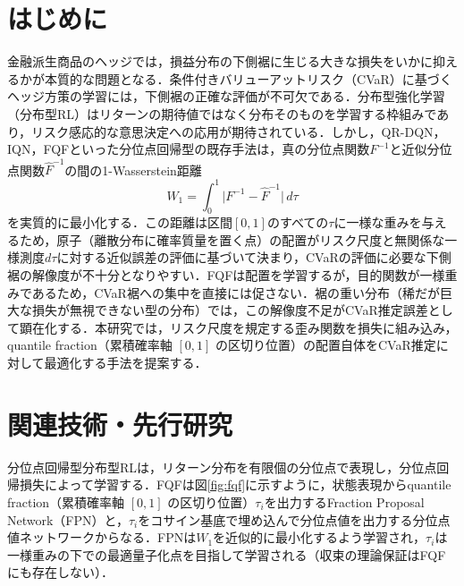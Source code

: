 \documentclass[a4paper,twocolumn,10pt]{jsarticle}
\begin{document}

\section{はじめに}
金融派生商品のヘッジでは，損益分布の下側裾に生じる大きな損失をいかに抑えるかが本質的な問題となる．条件付きバリューアットリスク（CVaR）に基づくヘッジ方策の学習には，下側裾の正確な評価が不可欠である．分布型強化学習（分布型RL）はリターンの期待値ではなく分布そのものを学習する枠組みであり，リスク感応的な意思決定への応用が期待されている．しかし，QR-DQN，IQN\cite{iqn}，FQF\cite{fqf}といった分位点回帰型の既存手法は，真の分位点関数$F^{-1}$と近似分位点関数$\hat F^{-1}$の間の1-Wasserstein距離
\begin{equation}
W_1=\int_0^1 \bigl|F^{-1}-\hat F^{-1}\bigr|\,d\tau
\end{equation}
を実質的に最小化する．この距離は区間$[0,1]$のすべての$\tau$に一様な重みを与えるため，原子（離散分布に確率質量を置く点）の配置がリスク尺度と無関係な一様測度$d\tau$に対する近似誤差の評価に基づいて決まり，CVaRの評価に必要な下側裾の解像度が不十分となりやすい．FQFは配置を学習するが，目的関数が一様重みであるため，CVaR裾への集中を直接には促さない．裾の重い分布（稀だが巨大な損失が無視できない型の分布）では，この解像度不足がCVaR推定誤差として顕在化する．本研究では，リスク尺度を規定する歪み関数を損失に組み込み，quantile fraction（累積確率軸 $[0, 1]$ の区切り位置）の配置自体をCVaR推定に対して最適化する手法を提案する．

\section{関連技術・先行研究}
分位点回帰型分布型RLは，リターン分布を有限個の分位点で表現し，分位点回帰損失によって学習する．FQF\cite{fqf}は図\ref{fig:fqf}に示すように，状態表現からquantile fraction（累積確率軸 $[0, 1]$ の区切り位置）$\tau_i$を出力するFraction Proposal Network（FPN）と，$\tau_i$をコサイン基底で埋め込んで分位点値を出力する分位点値ネットワークからなる．FPNは$W_1$を近似的に最小化するよう学習され，$\tau_i$は一様重みの下での最適量子化点を目指して学習される（収束の理論保証はFQFにも存在しない）．
\end{document}
